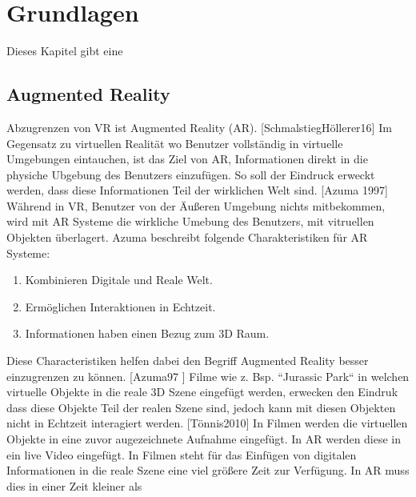 \chapter{Grundlagen}

Dieses Kapitel gibt eine  


\section{Augmented Reality}

Abzugrenzen von VR  ist Augmented Reality (AR). [SchmalstiegHöllerer16] Im Gegensatz zu virtuellen Realität wo Benutzer vollständig in virtuelle Umgebungen eintauchen,
ist das Ziel von AR, Informationen direkt in die physiche Ubgebung des Benutzers einzufügen. So soll der Eindruck erweckt werden, dass diese Informationen Teil der wirklichen Welt sind. %
[Azuma 1997] Während in VR, Benutzer von der Äußeren Umgebung nichts mitbekommen, wird mit AR Systeme die wirkliche Umebung des Benutzers, mit vitruellen Objekten überlagert. 
Azuma beschreibt folgende Charakteristiken für AR Systeme: 

\begin{enumerate}
	\item Kombinieren Digitale und Reale Welt.
	\item Ermöglichen Interaktionen in Echtzeit.
	\item Informationen haben einen Bezug zum 3D Raum.
\end{enumerate}

Diese Characteristiken helfen dabei den Begriff Augmented Reality besser einzugrenzen zu können. [Azuma97 ] Filme wie z. Bsp.  ``Jurassic Park`` in welchen virtuelle Objekte in die reale 3D Szene eingefügt werden, 
erwecken den Eindruk dass diese Objekte Teil der realen Szene sind, jedoch kann mit diesen Objekten nicht in Echtzeit interagiert werden. [Tönnis2010] In Filmen werden die virtuellen Objekte in eine zuvor augezeichnete 
Aufnahme eingefügt. In AR werden diese in ein live Video eingefügt. In Filmen steht für das Einfügen von digitalen Informationen in die reale Szene eine viel größere Zeit zur Verfügung. In AR muss dies in einer Zeit kleiner 
als 

